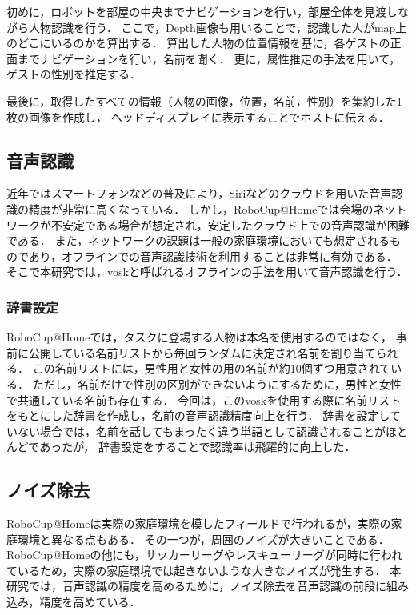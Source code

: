 \documentclass[a4j]{jarticle}
\begin{document}
初めに，ロボットを部屋の中央までナビゲーションを行い，部屋全体を見渡しながら人物認識を行う．
ここで，Depth画像も用いることで，認識した人がmap上のどこにいるのかを算出する．
算出した人物の位置情報を基に，各ゲストの正面までナビゲーションを行い，名前を聞く．
更に，属性推定の手法を用いて，ゲストの性別を推定する．

最後に，取得したすべての情報（人物の画像，位置，名前，性別）を集約した1枚の画像を作成し，
ヘッドディスプレイに表示することでホストに伝える．

\subsection{音声認識}
近年ではスマートフォンなどの普及により，Siriなどのクラウドを用いた音声認識の精度が非常に高くなっている．
しかし，RoboCup@Homeでは会場のネットワークが不安定である場合が想定され，安定したクラウド上での音声認識が困難である．
また，ネットワークの課題は一般の家庭環境においても想定されるものであり，オフラインでの音声認識技術を利用することは非常に有効である．
そこで本研究では，vosk\cite{vosk_hp}と呼ばれるオフラインの手法を用いて音声認識を行う．

\subsubsection{辞書設定}
RoboCup@Homeでは，タスクに登場する人物は本名を使用するのではなく，
事前に公開している名前リストから毎回ランダムに決定され名前を割り当てられる．
この名前リストには，男性用と女性の用の名前が約10個ずつ用意されている．
ただし，名前だけで性別の区別ができないようにするために，男性と女性で共通している名前も存在する．
今回は，このvoskを使用する際に名前リストをもとにした辞書を作成し，名前の音声認識精度向上を行う．
辞書を設定していない場合では，名前を話してもまったく違う単語として認識されることがほとんどであったが，
辞書設定をすることで認識率は飛躍的に向上した．

\subsection{ノイズ除去}
RoboCup@Homeは実際の家庭環境を模したフィールドで行われるが，実際の家庭環境と異なる点もある．
その一つが，周囲のノイズが大きいことである．
RoboCup@Homeの他にも，サッカーリーグやレスキューリーグが同時に行われているため，実際の家庭環境では起きないような大きなノイズが発生する．
本研究では，音声認識の精度を高めるために，ノイズ除去\cite{sainburg2020finding}を音声認識の前段に組み込み，精度を高めている．
\end{document}
